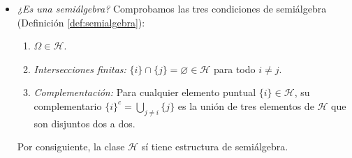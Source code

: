 \begin{problema}
\begin{enumerate}[label=\alph*)]
\begin{itemize}
        \item \textit{¿Es una semiálgebra?}
        Comprobamos las tres condiciones de semiálgebra (Definición \ref{def:semialgebra}):
        \begin{enumerate}
            \item $\Omega \in \mathcal{H}$.
            \item \textit{Intersecciones finitas:} $\{i\} \cap \{j\} = \varnothing \in \mathcal{H}$ para todo $i \neq j$.
            \item \textit{Complementación:} Para cualquier elemento puntual $\{i\} \in \mathcal{H}$, su complementario $\{i\}^c = \bigcup_{j \neq i} \{j\}$ es la unión de tres elementos de $\mathcal{H}$ que son disjuntos dos a dos.
        \end{enumerate}
        Por consiguiente, la clase $\mathcal{H}$ sí tiene estructura de semiálgebra.
    \end{itemize}
\end{enumerate}
\end{problema}

